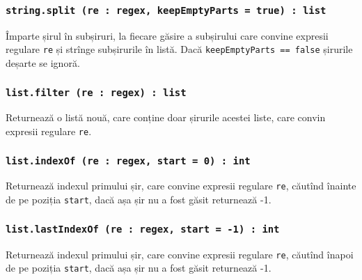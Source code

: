 \subsubsection{\texttt{string.split (re : regex, keepEmptyParts = true) : list}}

Împarte șirul în subșiruri, la fiecare găsire a subșirului care convine expresii regulare \texttt{re} și strînge subșirurile în listă. Dacă \texttt{keepEmptyParts == false} șirurile deșarte se ignoră.

\subsubsection{\texttt{list.filter (re : regex) : list}}

Returnează o listă nouă, care conține doar șirurile acestei liste, care convin expresii regulare \texttt{re}.

\subsubsection{\texttt{list.indexOf (re : regex, start = 0) : int}}

Returnează indexul primului șir, care convine expresii regulare \texttt{re}, căutînd înainte de pe poziția \texttt{start}, dacă așa șir nu a fost găsit returnează -1.

\subsubsection{\texttt{list.lastIndexOf (re : regex, start = -1) : int}}

Returnează indexul primului șir, care convine expresii regulare \texttt{re}, căutînd înapoi de pe poziția \texttt{start}, dacă așa șir nu a fost găsit returnează -1.


